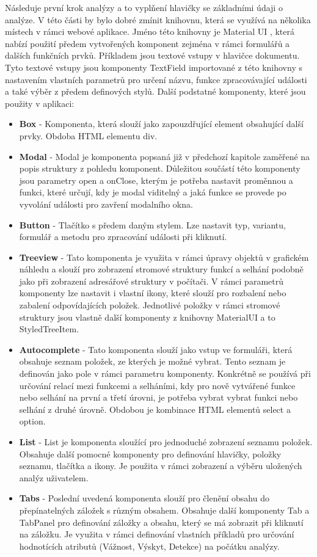 Následuje první krok analýzy a to vyplňení hlavičky se základními údaji o analýze. V této části by bylo dobré zmínit knihovnu, která se využívá na několika místech v rámci webové aplikace. Jméno této knihovny je Material UI \cite{mui}, která nabízí použití předem vytvořených komponent zejména v rámci formulářů a dalších funkčních prvků. Příkladem jsou textové vstupy v hlavičce dokumentu. Tyto textové vstupy jsou komponenty TextField importované z této knihovny s nastavením vlastních parametrů pro určení názvu, funkce zpracovávající události a také výběr z předem definových stylů. Další podstatné komponenty, které jsou použity v aplikaci: 
\begin{itemize}
    \item \textbf{Box} - Komponenta, která slouží jako zapouzdřující element obsahující další prvky. Obdoba HTML elementu div.
    \item \textbf{Modal} - Modal je komponenta popsaná již v předchozí kapitole zaměřené na popis struktury z pohledu komponent. Důležitou součástí této komponenty jsou parametry open a onClose, kterým je potřeba nastavit proměnnou a funkci, které určují, kdy je modal viditelný a jaká funkce se provede po vyvolání události pro zavření modalního okna.  
    \item \textbf{Button} - Tlačítko s předem daným stylem. Lze nastavit typ, variantu, formulář a metodu pro zpracování události při kliknutí. 
    \item \textbf{Treeview} - Tato komponenta je využita v rámci úpravy objektů v grafickém náhledu a slouží pro zobrazení stromové struktury funkcí a selhání podobně jako při zobrazení adresářové struktury v počítači. V rámci parametrů komponenty lze nastavit i vlastní ikony, které slouží pro rozbalení nebo zabalení odpovídajících položek. Jednotlivé položky v rámci stromové struktury jsou vlastně další komponenty z knihovny MaterialUI a to StyledTreeItem.
    \item \textbf{Autocomplete} - Tato komponenta slouží jako vstup ve formuláři, která obsahuje seznam položek, ze kterých je možné vybrat. Tento seznam je definován jako pole v rámci parametru komponenty. Konkrétně se používá při určování relací mezi funkcemi a selháními, kdy pro nově vytvářené funkce nebo selhání na první a třetí úrovni, je potřeba vybrat vybrat funkci nebo selhání z druhé úrovně. Obdobou je kombinace HTML elementů select a option. 
    \item \textbf{List} - List je komponenta sloužící pro jednoduché zobrazení seznamu položek. Obsahuje další pomocné komponenty pro definování hlavičky, položky seznamu, tlačítka a ikony. Je použita v rámci zobrazení a výběru uložených analýz uživatelem. 
    \item \textbf{Tabs} - Poslední uvedená komponenta slouží pro členění obsahu do přepínatelných záložek s různým obsahem. Obsahuje další komponenty Tab a TabPanel pro definování záložky a obsahu, který se má zobrazit při kliknutí na záložku. Je využita v rámci definování vlastních příkladů pro určování hodnotících atributů (Vážnost, Výskyt, Detekce) na počátku analýzy. 
\end{itemize}

